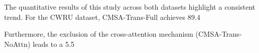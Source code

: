 The quantitative results of this study across both datasets highlight a consistent trend. For the CWRU dataset, CMSA-Trans-Full achieves 89.4%

Furthermore, the exclusion of the cross-attention mechanism (CMSA-Trans-NoAttn) leads to a 5.5%

